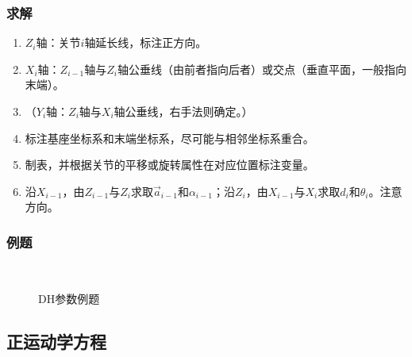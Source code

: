 \documentclass[
12pt, %
a4paper, 
oneside, %
headinclude,footinclude, %
]{scrartcl}
\begin{document}
\subsubsection[求解]{求解}
\begin{enumerate}
\item $ Z_i $轴：关节$ i $轴延长线，标注正方向。
\item $ X_i $轴：$ Z_{i - 1} $轴与$ Z_i $轴公垂线（由前者指向后者）或交点（垂直平面，一般指向末端）。
\item （$ Y_i $轴：$ Z_i $轴与$ X_i $轴公垂线，右手法则确定。）
\item 标注基座坐标系和末端坐标系，尽可能与相邻坐标系重合。
\item 制表，并根据关节的平移或旋转属性在对应位置标注变量。
\item 沿$ X_{i - 1} $，由$ Z_{i - 1} $与$ Z_i $求取$ \vec{a}_{i - 1}  $和$ \alpha_{i - 1} $；沿$ Z_i $，由$ X_{i - 1} $与$ X_i $求取$ d_i $和$ \theta_i $。注意方向。
\end{enumerate}
\subsubsection[例题]{例题}
\begin{figure}[H]
\centering
\subfloat[例1结构图]{\texttt{[image: 1.1.1]}} \quad
\subfloat[例2结构图]{\texttt{[image: 1.2.1]}} \quad
\subfloat[例3结构图]{\texttt{[image: 1.3.1]}} \quad
\subfloat[例4结构图]{\texttt{[image: 1.4.1]}} \\
\subfloat[例1参数表]{\texttt{[image: 1.1.2]}} \quad
\subfloat[例2参数表]{\texttt{[image: 1.2.2]}} \quad
\subfloat[例3参数表]{\texttt{[image: 1.3.2]}} \quad
\subfloat[例4参数表]{\texttt{[image: 1.4.2]}}
\caption{DH参数例题}
\end{figure}
\subsection[正运动学方程]{正运动学方程}
\end{document}
